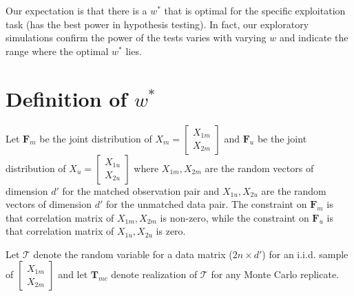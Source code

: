 \documentclass[11pt]{article} %
\begin{document}
Our expectation is that there is a $w^*$ that is optimal for the specific exploitation task (has the best power in hypothesis testing). In fact, our exploratory simulations confirm the power of the tests varies with varying $w$ and indicate the range where the optimal  $w^*$ lies.



\section{Definition of  $w^*$}

Let $\mathbf{F}_m$ be the joint distribution of
$X_m= \left[
 \begin{array}{c}
X_{1m}\\
X_{2m}
\end{array}
\right]$ and 
$\mathbf{F}_u$ be the  joint distribution of
$X_u= \left[
 \begin{array}{c}
 X_{1u}\\
 X_{2u} 
\end{array}
\right]$
 where   $X_{1m},X_{2m}$ are the random vectors of dimension $d'$ for the matched observation pair and $X_{1u},X_{2u}$ are the random vectors of dimension $d'$ for the unmatched data pair.   The constraint on  $\mathbf{F}_m$ is that  correlation  matrix of $X_{1m},X_{2m}$ is non-zero, while  the constraint on $\mathbf{F}_u$   is that correlation  matrix of $X_{1u},X_{2u}$ is zero.

Let $\mathcal{T}$ denote  the random variable for a data matrix ($2n\times d'$) for an  i.i.d. sample of  
$\left[ \begin{array}{c}
X_{1m}\\
X_{2m}
\end{array}
\right]$ and let  $\mathbf{T}_{mc}$  denote realization of $\mathcal{T}$ for any Monte Carlo replicate.
\end{document}
